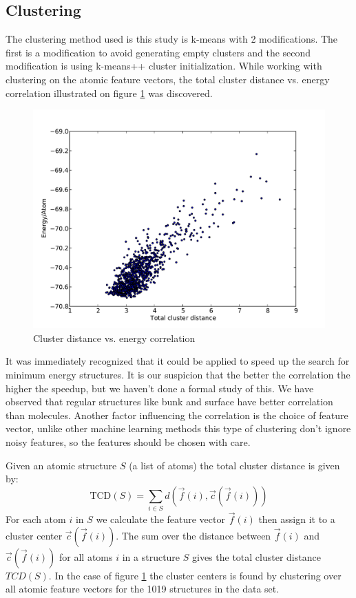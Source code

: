 \documentclass[%
 aps,
 prl,%
 amsmath,amssymb,
 reprint,%
]{revtex4-1}
\begin{document}
\subsection{Clustering}
The clustering method used is this study is k-means with 2
modifications. The first is a modification to avoid generating empty
clusters \cite{Malay2009} and the second modification is using
k-means++ cluster initialization. While working with clustering on the
atomic feature vectors, the total cluster distance vs. energy correlation
illustrated on figure \ref{fig_corr} was discovered. 

\begin{figure}[h]
    \centering
    \includegraphics[width=1.0\columnwidth]{decoorL2_5_fgen_Ti13O26Ridge_9_11_9_1510066208.pdf}
    \caption{Cluster distance vs. energy correlation}
    \label{fig_corr}
\end{figure}

It was immediately recognized that it could be applied to speed up the search for minimum energy structures.
It is our suspicion that the better the correlation the higher the speedup, 
but we haven't done a formal study of this. We have observed that regular structures like bunk and surface have better correlation than molecules. Another factor influencing the correlation is the choice of feature vector, 
unlike other machine learning methods this type of clustering don't ignore noisy features, so the features should be chosen with care.  
 
Given an atomic structure $S$ (a list of atoms) the total cluster distance is given by:
\begin{equation}
\text{TCD}(S) = \sum_{i \in S} d(\vec f(i), \vec c(\vec f(i))) \label{eq3}
\end{equation}
For each atom $i$ in $S$ we calculate the feature vector $\vec f(i)$ then 
assign it to a cluster center $\vec c(\vec f(i))$.   
The sum over the distance between $\vec f(i)$ and $\vec c(\vec f(i))$ for all atoms $i$ in a structure $S$ 
gives the total cluster distance $TCD(S)$.
In the case of figure \ref{fig_corr} the cluster centers is found by clustering over all atomic feature vectors 
for the 1019 structures in the data set. 
\end{document}
